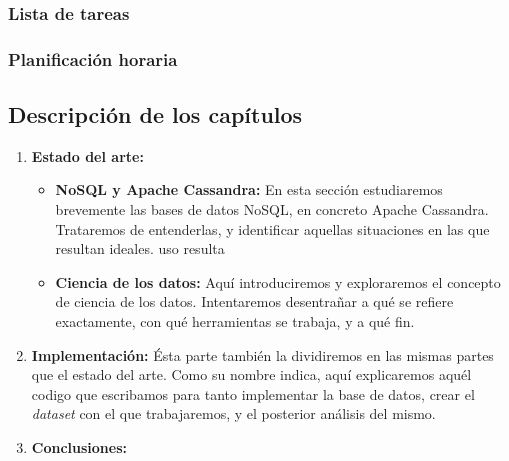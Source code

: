 \subsubsection{Lista de tareas}
\label{subsubsec:tasklist}

% 

\subsubsection{Planificación horaria}
\label{subsubsec:hores}

\subsection{Descripción de los capítulos}
\label{subsec:chaps}


\begin{enumerate}
  \item \textbf{Estado del arte: }
    \begin{itemize}
      \item \textbf{NoSQL y Apache Cassandra: } En esta sección estudiaremos
        brevemente las bases de datos NoSQL, en concreto Apache Cassandra.
        Trataremos de entenderlas, y identificar aquellas situaciones en las que
        resultan ideales.
        uso resulta
      \item \textbf{Ciencia de los datos: } Aquí introduciremos y exploraremos el
        concepto de ciencia de los datos. Intentaremos desentrañar a qué se refiere
        exactamente, con qué herramientas se trabaja, y a qué fin.
    \end{itemize}
  \item \textbf{Implementación: }  Ésta parte también la dividiremos en las
    mismas partes que el estado del arte. Como su nombre indica, aquí
    explicaremos aquél codigo que escribamos para tanto implementar la base de
    datos, crear el \emph{dataset} con el que trabajaremos, y el posterior
    análisis del mismo.
  \item \textbf{Conclusiones: } 
\end{enumerate}
\clearpage

